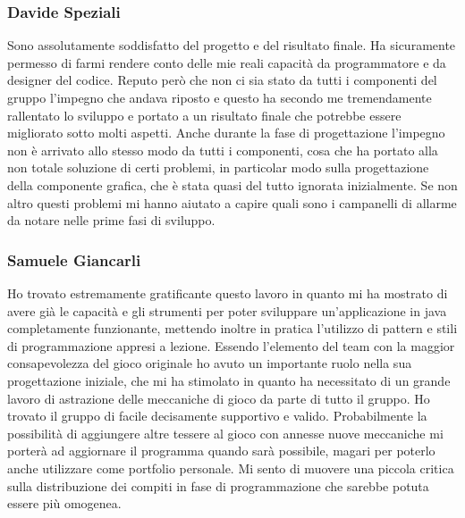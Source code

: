 \subsubsection*{Davide Speziali}
Sono assolutamente soddisfatto del progetto e del risultato finale. Ha sicuramente permesso di farmi rendere conto delle mie reali capacità da programmatore e da designer del codice. Reputo però che non ci sia stato da tutti i componenti del gruppo l'impegno che andava riposto e questo ha secondo me tremendamente rallentato lo sviluppo e portato a un risultato finale che potrebbe essere migliorato sotto molti aspetti. Anche durante la fase di progettazione l'impegno non è arrivato allo stesso modo da tutti i componenti, cosa che ha portato alla non totale soluzione di certi problemi, in particolar modo sulla progettazione della componente grafica, che è stata quasi del tutto ignorata inizialmente. Se non altro questi problemi mi hanno aiutato a capire quali sono i campanelli di allarme da notare nelle prime fasi di sviluppo.

\subsubsection*{Samuele Giancarli}
Ho trovato estremamente gratificante questo lavoro in quanto mi ha mostrato di avere già le capacità e gli strumenti per poter sviluppare un'applicazione in java completamente funzionante, mettendo inoltre in pratica l'utilizzo di pattern e stili di programmazione appresi a lezione. Essendo l'elemento del team con la maggior consapevolezza del gioco originale ho avuto un importante ruolo nella sua progettazione iniziale, che mi ha stimolato in quanto ha necessitato di un grande lavoro di astrazione delle meccaniche di gioco da parte di tutto il gruppo. Ho trovato il gruppo di facile  decisamente supportivo e valido. Probabilmente la possibilità di aggiungere altre tessere al gioco con annesse nuove meccaniche mi porterà ad aggiornare il programma quando sarà possibile, magari per poterlo anche utilizzare come portfolio personale. Mi sento di muovere una piccola critica sulla distribuzione dei compiti in fase di programmazione che sarebbe potuta essere più omogenea.

